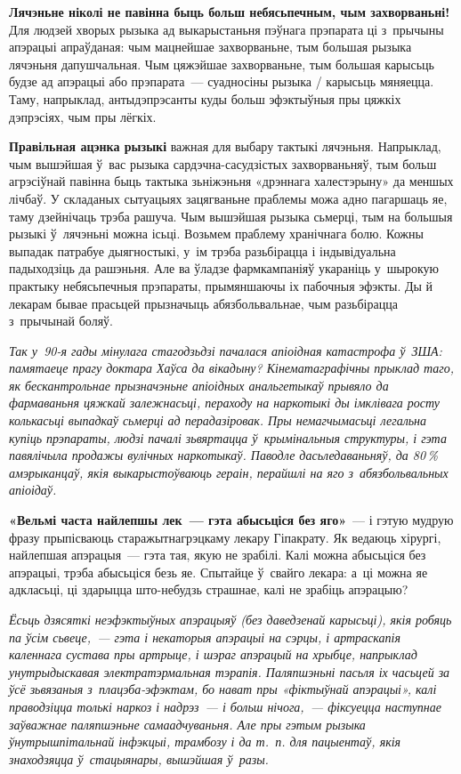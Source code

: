 \textbf{Лячэньне ніколі не павінна быць больш небясьпечным, чым захворваньні!} Для людзей хворых рызыка ад выкарыстаньня пэўнага прэпарата ці з~прычыны апэрацыі апраўданая: чым мацнейшае захворваньне, тым большая рызыка лячэньня дапушчальная. Чым цяжэйшае захворваньне, тым большая карысьць будзе ад апэрацыі або прэпарата~--- суадносіны рызыка / карысьць мяняецца. Таму, напрыклад, антыдэпрэсанты куды больш эфэктыўныя пры цяжкіх дэпрэсіях, чым пры лёгкіх.

\textbf{Правільная ацэнка рызыкі} важная для выбару тактыкі лячэньня. Напрыклад, чым вышэйшая ў~вас рызыка сардэчна-сасудзістых захворваньняў, тым больш агрэсіўнай павінна быць тактыка зьніжэньня «дрэннага халестэрыну» да меншых лічбаў. У складаных сытуацыях зацягваньне праблемы можа адно пагаршаць яе, таму дзейнічаць трэба рашуча. Чым вышэйшая рызыка сьмерці, тым на большыя рызыкі ў~лячэньні можна ісьці. Возьмем праблему хранічнага болю. Кожны выпадак патрабуе дыягностыкі, у~ім трэба разьбірацца і індывідуальна падыходзіць да рашэньня. Але ва ўладзе фармкампаніяў укараніць у~шырокую практыку небясьпечныя прэпараты, прымяншаючы іх пабочныя эфэкты. Ды й лекарам бывае прасьцей прызначыць абязбольвальнае, чым разьбірацца з~прычынай боляў.

\emph{Так у~90-я гады мінулага стагодзьдзі пачалася апіоідная катастрофа ў~ЗША: памятаеце прагу доктара Хаўса да вікадыну? Кінематаграфічны прыклад таго, як бескантрольнае прызначэньне апіоідных анальгетыкаў прывяло да фармаваньня цяжкай залежнасьці, пераходу на наркотыкі ды імклівага росту колькасьці выпадкаў сьмерці ад перадазіровак. Пры немагчымасьці легальна купіць прэпараты, людзі пачалі зьвяртацца ў~крымінальныя структуры, і гэта павялічыла продажы вулічных наркотыкаў. Паводле дасьледаваньняў, да 80\,\% амэрыканцаў, якія выкарыстоўваюць гераін, перайшлі на яго з~абязбольвальных апіоідаў.}

\textbf{«Вельмі часта найлепшы лек~--- гэта абысьціся без яго»}~--- і гэтую мудрую фразу прыпісваюць старажытнагрэцкаму лекару Гіпакрату. Як ведаюць хірургі, найлепшая апэрацыя~--- гэта тая, якую не зрабілі. Калі можна абысьціся без апэрацыі, трэба абысьціся безь яе. Спытайце ў~свайго лекара: а~ці можна яе адкласьці, ці здарыцца што-небудзь страшнае, калі не зрабіць апэрацыю?

\emph{Ёсьць дзясяткі неэфэктыўных апэрацыяў (без даведзенай карысьці), якія робяць па ўсім сьвеце,~--- гэта і некаторыя апэрацыі на сэрцы, і артраскапія каленнага сустава пры артрыце, і шэраг апэрацый на хрыбце, напрыклад унутрыдыскавая электратэрмальная тэрапія. Паляпшэньні пасьля іх часьцей за ўсё зьвязаныя з~плацэба-эфэктам, бо нават пры «фіктыўнай апэрацыі», калі праводзіцца толькі наркоз і надрэз~--- і больш нічога,~--- фіксуецца наступнае заўважнае паляпшэньне самаадчуваньня. Але пры гэтым рызыка ўнутрышпітальнай інфэкцыі, трамбозу і да т.~п. для пацыентаў, якія знаходзяцца ў~стацыянары, вышэйшая ў~разы.}

